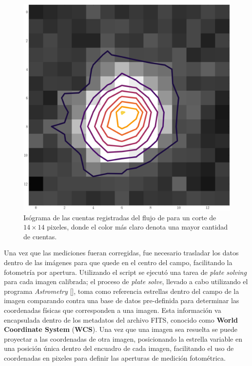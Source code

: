 \begin{figure}[!ht]
	\centering
	\includegraphics[scale=0.4]{Observaciones/Secciones/Figures/Figura Pixel Perfil Contorno.png}
	\caption{Isógrama de las cuentas registradas del flujo de \atoObjId para un
	corte de $14 \times 14$ pixeles, donde el color más claro denota una mayor
	cantidad de cuentas.}
	\label{figuraPixelContorno}
\end{figure}

Una vez que las mediciones fueran corregidas, fue necesario trasladar los datos
dentro de las imágenes para que \atoObjId quede en el centro del campo,
facilitando la fotometría por apertura. Utilizando el script
\href{https://github.com/KnightIV/UANL_MAPTA_Observaciones/blob/main/analisis/iturbide/shift_images.py}{}
se ejecutó una tarea de \textit{plate solving} para cada imagen calibrada; el
proceso de \textit{plate solve}, llevado a cabo utilizando el programa
\textit{Astrometry} [], toma como referencia estrellas
dentro del campo de la imagen comparando contra una base de datos pre-definida
para determinar las coordenadas físicas que corresponden a una imagen. Esta
información va encapsulada dentro de los metadatos del archivo FITS, conocido
como \textbf{World Coordinate System} (\textbf{WCS}). Una vez que una imagen sea
resuelta se puede proyectar a las coordenadas de otra imagen, posicionando la
estrella variable en una posición única dentro del encuadro de cada imagen,
facilitando el uso de coordenadas en pixeles para definir las aperturas de
medición fotométrica.

